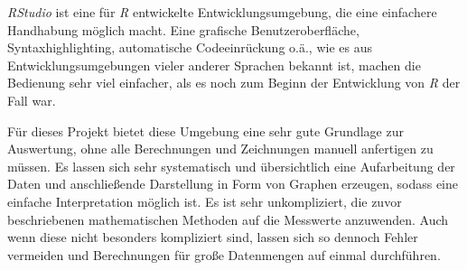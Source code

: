 \textit{RStudio} ist eine für \textit{R} entwickelte Entwicklungsumgebung, die eine einfachere Handhabung möglich macht. Eine grafische Benutzeroberfläche, Syntaxhighlighting, automatische Codeeinrückung o.ä., wie es aus Entwicklungsumgebungen vieler anderer Sprachen bekannt ist, machen die Bedienung sehr viel einfacher, als es noch zum Beginn der Entwicklung von \textit{R} der Fall war. \cite{rstudio}

Für dieses Projekt bietet diese Umgebung eine sehr gute Grundlage zur Auswertung, ohne alle Berechnungen und Zeichnungen manuell anfertigen zu müssen. Es lassen sich sehr systematisch und übersichtlich eine Aufarbeitung der Daten und anschließende Darstellung in Form von Graphen erzeugen, sodass eine einfache Interpretation möglich ist. Es ist sehr unkompliziert, die zuvor beschriebenen mathematischen Methoden auf die Messwerte anzuwenden. Auch wenn diese nicht besonders kompliziert sind, lassen sich so dennoch Fehler vermeiden und Berechnungen für große Datenmengen auf einmal durchführen.
